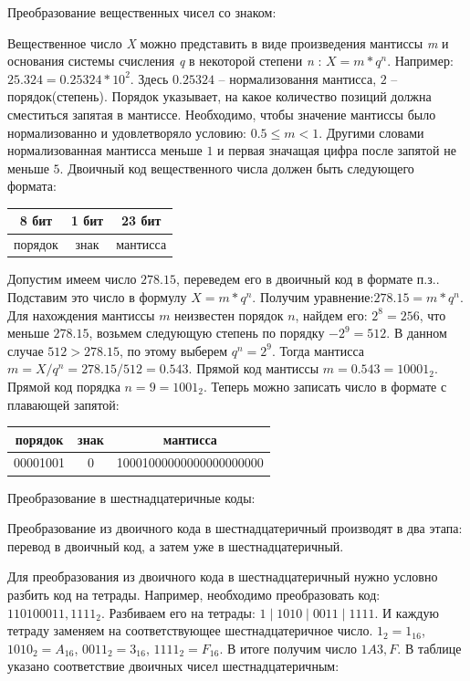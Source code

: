 \documentclass[unicode, 12pt, a4paper, oneside]{article}
\begin{document}
Преобразование вещественных чисел со знаком:

Вещественное число {\it X} можно представить в виде произведения мантиссы {\it m } и основания системы счисления {\it q } в некоторой степени {\it n } : $ X=m \ast q^{n} $. 
Например: $ 25.324 = 0.25324\ast 10^{2} $. Здесь $ 0.25324 $ – нормализовання мантисса, $ 2 $ – порядок(степень). Порядок указывает, на какое количество позиций должна сместиться запятая в мантиссе. Необходимо, чтобы значение мантиссы было нормализованно и удовлетворяло условию: $ 0.5 \leq m < 1 $. Другими словами нормализованная мантисса меньше $ 1 $ и первая значащая цифра после запятой не меньше $ 5 $. 
Двоичный код вещественного числа должен быть следующего формата:

\begin{center}
\begin{tabular}{|c|c|c|}
\hline 8 бит   & 1 бит & 23 бит   \\ 
\hline порядок & знак  & мантисса \\ 
\hline 
\end{tabular}
\end{center}
 
Допустим имеем число $278.15$, переведем его в двоичный код в формате п.з.. Подставим это число в формулу $ X=m\ast q^{n} $. Получим уравнение:$278.15= m\ast q^{n}$. Для нахождения мантиссы $m$ неизвестен порядок $n $, найдем его: $2^{8}=256$, что меньше $278.15$, возьмем следующую степень по порядку $-2^{9}=512$. В данном случае $512>278.15$, по этому выберем $q^{n}=2^{9}$. Тогда мантисса $m=X/q^{n} =278.15/512=0.543$. Прямой код мантиссы $m=0.543=10001_{2}$. Прямой код порядка $n=9=1001_{2}$. Теперь можно записать число в формате с плавающей запятой:

\begin{center}
\begin{tabular}{|c|c|c|}
\hline порядок  & знак & мантисса                \\ 
\hline 00001001 & 0    & 10001000000000000000000 \\ 
\hline 
\end{tabular}
\end{center}

Преобразование в шестнадцатеричные коды:

Преобразование из двоичного кода в шестнадцатеричный производят в два этапа: перевод в двоичный код, а затем уже в шестнадцатеричный.

Для преобразования из двоичного кода в шестнадцатеричный нужно условно разбить код на тетрады. Например, необходимо преобразовать код: $ 110100011,1111_{2} $. Разбиваем его на тетрады: $ 1 \mid 1010 \mid 0011 \mid 1111 $. И каждую тетраду заменяем на соответствующее шестнадцатеричное число. $ 1_{2} = 1_{16} $, $ 1010_{2} = A_{16} $, $ 0011_{2} = 3_{16} $, $ 1111_{2} = F_{16} $. В итоге получим число $ 1A3,F $. В таблице указано соответствие двоичных чисел шестнадцатеричным:
\end{document}
